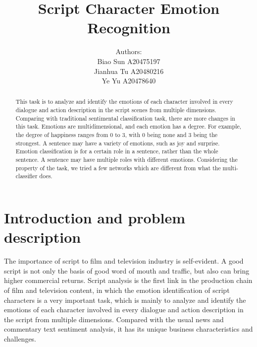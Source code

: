 \documentclass[12pt,twocolumn,letterpaper]{article}
\begin{document}
\title{Script Character Emotion Recognition}

\author{Authors:\\
Biao Sun A20475197\\
Jianhua Tu A20480216\\
Ye Yu A20478640\\

}

\maketitle

\begin{abstract}
This task is to analyze and identify the emotions of each character involved in every dialogue and action description in the script scenes from multiple dimensions. Comparing with traditional sentimental classification task, there are more changes in this task. Emotions are multidimensional, and each emotion has a degree. For example, the degree of happiness ranges from 0 to 3, with 0 being none and 3 being the strongest. A sentence may have a variety of emotions, such as joy and surprise. Emotion classification is for a certain role in a sentence, rather than the whole sentence. A sentence may have multiple roles with different emotions. Considering the property of the task, we tried a few networks which are different from what the multi-classifier does.
\end{abstract}

\section{Introduction and problem description}

The importance of script to film and television industry is self-evident. A good script is not only the basis of good word of mouth and traffic, but also can bring higher commercial returns. Script analysis is the first link in the production chain of film and television content, in which the emotion identification of script characters is a very important task, which is mainly to analyze and identify the emotions of each character involved in every dialogue and action description in the script from multiple dimensions. Compared with the usual news and commentary text sentiment analysis, it has its unique business characteristics and challenges. 
\end{document}
